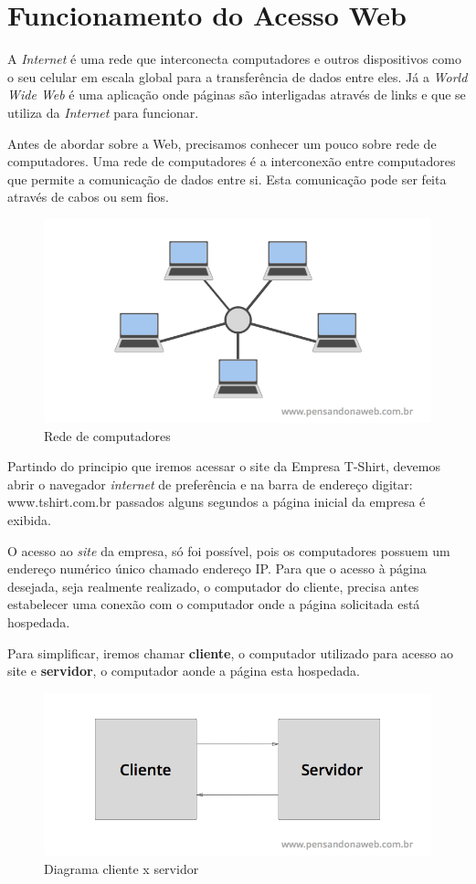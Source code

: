 \section{Funcionamento do Acesso Web}

A \textit{Internet} é uma rede que interconecta computadores e outros dispositivos como o seu celular em escala global para a transferência de dados entre eles. Já a \textit{World Wide Web} é uma aplicação onde páginas são interligadas através de links e que se utiliza da \textit{Internet} para funcionar.

Antes de abordar sobre a Web, precisamos conhecer um pouco sobre rede de computadores. Uma rede de computadores é a interconexão entre computadores que permite a comunicação de dados entre si. Esta comunicação pode ser feita através de cabos ou sem fios.

\begin{figure}[H]
    \centering
    \includegraphics[width=0.7\linewidth]{dados/figuras/rede}
    \caption{Rede de computadores}
    \label{fig:rede}
\end{figure}

Partindo do principio que iremos acessar o site da Empresa T-Shirt, devemos abrir o navegador \textit{internet} de preferência e na barra de endereço digitar: www.tshirt.com.br passados alguns segundos a página inicial da empresa é exibida.

O acesso ao \textit{site} da empresa, só foi possível, pois os computadores possuem um endereço numérico único chamado endereço IP. Para que o acesso à página desejada, seja realmente realizado, o computador do cliente, precisa antes estabelecer uma conexão com o computador onde a página solicitada está hospedada.

Para simplificar, iremos chamar \textbf{cliente}, o computador utilizado para acesso ao site e \textbf{servidor}, o computador aonde a página esta hospedada.

\begin{figure}[H]
    \centering
    \includegraphics[width=0.7\linewidth]{dados/figuras/clientserver}
    \caption{Diagrama cliente x servidor}
    \label{fig:clientserver}
\end{figure}

